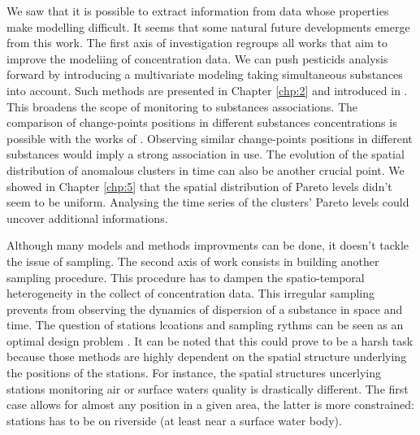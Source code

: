 We saw that it is possible to extract information from data whose properties make modelling difficult. It seems that some natural future developments emerge from this work. 
The first axis of investigation regroups all works that aim to improve the modeliing of concentration data. We can push pesticids analysis forward by introducing a multivariate modeling taking simultaneous substances into account. Such methods are presented in Chapter \ref{chp:2} and introduced in \cite{pickering2016changepoint}. This broadens the scope of monitoring to substances associations. The comparison of change-points positions in different substances concentrations is possible with the works of \cite{Cleynen2014}. Observing similar change-points positions in different substances would imply a strong association in use. The evolution of the spatial distribution of anomalous clusters in time can also be another crucial point. We showed in Chapter \ref{chp:5} that the spatial distribution of Pareto levels didn't seem to be uniform. Analysing the time series of the clusters' Pareto levels could uncover additional informations.  
 
Although many models and methods improvments can be done, it doesn't tackle the issue of sampling. The second axis of work consists in building another sampling procedure. This procedure has to dampen the spatio-temporal heterogeneity in the collect of concentration data. This irregular sampling prevents from observing the dynamics of dispersion of a substance in space and time. The question of stations lcoations and sampling rythms can be seen as an optimal design problem \cite{Mueller2011,Marsh2012}. It can be noted that this could prove to be a harsh task because those methods are highly dependent on the spatial structure underlying the positions of the stations. For instance, the spatial structures uncerlying stations monitoring air or surface waters quality is drastically different. The first case allows for almost any position in a given area, the latter is more constrained: stations has to be on riverside (at least near a surface water body).  
